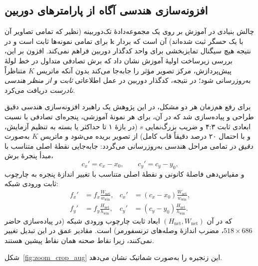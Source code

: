 \subsection{افزونه‌سازی هندسی آگاه از پارامترهای دوربین}
\label{subsec:fov_augmentation}

چالش بنیادی در آموزش \proposedmodel{} بر روی یک مجموعه‌دادهٔ تک‌دوربینه (نظیر  که تمامی تصاویر آن با یک حسگر  ثبت شده‌اند) آن است که بردار $\mathbf{k}$ برای تمامی نمونه‌ها ثابت است و در نتیجه هیچ سیگنال تمایزبخشی برای واحد کدگذار دوربین فراهم نمی‌کند. افزون بر این، بررسی زیرساخت اولیهٔ آموزش نشان داد که برش تصادفی متداول در خط لولهٔ پیش‌پردازش، مرکز تصویر مؤثر را جابه‌جا می‌کند بدون آنکه ماتریس $K$ متناظراً به‌روزرسانی شود؛ در نتیجه، کدگذار دوربین در عمل اطلاعاتی \emph{ثابت و از منظر هندسی نادرست} دریافت می‌کرد.

برای رفع هم‌زمان هر دو مشکل، در این پژوهش یک راهبرد افزونه‌سازی هندسی دقیق طراحی و پیاده‌سازی شد که در آن، برای هر نمونهٔ آموزشی، پنجره‌ای تصادفی با نسبت ابعادی ثابت ۴:۳ و ضریب بزرگ‌نمایی $s$ (در بازهٔ ۱ تا حداکثر  یا  بسته به تنظیم آزمایش، و با احتمال ۲۰ درصد دقیقاً قاب کامل) از تصویر بریده می‌شود و ماتریس $K$ به‌صورت \emph{دقیق} در تمامی مراحل هندسی به‌روزرسانی می‌گردد: جابه‌جایی نقطهٔ اصلی متناسب با مبدأ پنجرهٔ برش،
\begin{equation}
c_x' = c_x - x_0, \qquad c_y' = c_y - y_0,
\end{equation}
و مقیاس‌دهی فاصلهٔ کانونی و نقطهٔ اصلی متناسب با تغییر اندازهٔ پنجره به چارچوب ثابت ورودی شبکه:
\begin{equation}
\begin{aligned}
f_x' &= f_x \frac{W_{\mathrm{net}}}{w_{\mathrm{win}}}, &
c_x' &= (c_x-x_0)\frac{W_{\mathrm{net}}}{w_{\mathrm{win}}},\\
f_y' &= f_y \frac{H_{\mathrm{net}}}{h_{\mathrm{win}}}, &
c_y' &= (c_y-y_0)\frac{H_{\mathrm{net}}}{h_{\mathrm{win}}}.
\end{aligned}
\end{equation}
که در آن $(H_{\mathrm{net}}, W_{\mathrm{net}})$ ابعاد ثابت چارچوب ورودی شبکه (در پیاده‌سازی حاضر $518 \times 686$، مضرب اندازهٔ وصله‌های ترنسفورمر) است. مقادیر عمق در این تبدیل تغییر نمی‌کنند، زیرا نقاط صحنه همان نقاط پیشین هستند.

شکل~\ref{fig:zoom_crop_aug} این زنجیره را به‌صورت شماتیک نشان می‌دهد.

